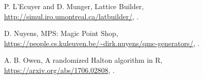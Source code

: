 {\begin{thebibliography}{1}
P. L'Ecuyer and D. Munger,
\newblock Lattice Builder, \url{http://simul.iro.umontreal.ca/latbuilder/},
.

D. Nuyens,
\newblock MPS: Magic Point Shop, \url{https://people.cs.kuleuven.be/~dirk.nuyens/qmc-generators/},
.

A. B. Owen,
\newblock
A randomized Halton algorithm in R, \url{https://arxiv.org/abs/1706.02808},
.

\end{thebibliography}
}  %


